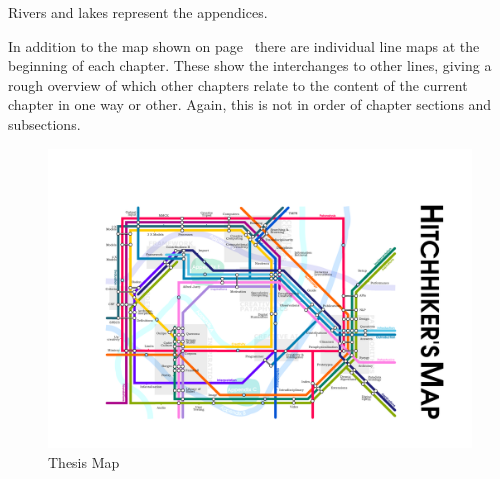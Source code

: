 \documentclass[11pt]{thesis} %
\begin{document}
Rivers and lakes represent the appendices. 

\spirals

In addition to the map shown on page~\pageref{map} there are individual line maps at the beginning of each chapter. These show the interchanges to other lines, giving a rough overview of which other chapters relate to the content of the current chapter in one way or other. Again, this is not in order of chapter sections and subsections.


\clearpage
\begin{figure}[!htbp]
\centering
  \includegraphics[width=\linewidth]{map}
\captionsetup{textformat=empty,labelformat=blank}
\caption[Thesis Map]{Thesis Map}
\label{map}
\end{figure}
\end{document}
